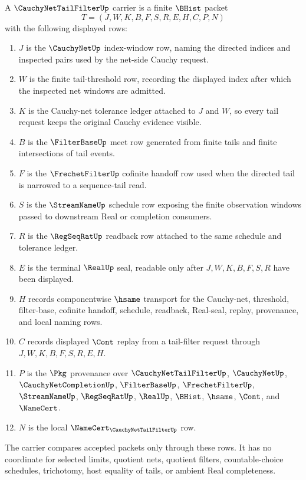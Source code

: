 \begin{definition}
\label{def:cauchy-net-tail-filter-carrier}
A $\CauchyNetTailFilterUp$ carrier is a finite $\BHist$ packet
$$
T=(J,W,K,B,F,S,R,E,H,C,P,N)
$$
with the following displayed rows:
\begin{enumerate}
\item $J$ is the $\CauchyNetUp$ index-window row, naming the directed indices and inspected pairs used by the net-side Cauchy request.
\item $W$ is the finite tail-threshold row, recording the displayed index after which the inspected net windows are admitted.
\item $K$ is the Cauchy-net tolerance ledger attached to $J$ and $W$, so every tail request keeps the original Cauchy evidence visible.
\item $B$ is the $\FilterBaseUp$ meet row generated from finite tails and finite intersections of tail events.
\item $F$ is the $\FrechetFilterUp$ cofinite handoff row used when the directed tail is narrowed to a sequence-tail read.
\item $S$ is the $\StreamNameUp$ schedule row exposing the finite observation windows passed to downstream Real or completion consumers.
\item $R$ is the $\RegSeqRatUp$ readback row attached to the same schedule and tolerance ledger.
\item $E$ is the terminal $\RealUp$ seal, readable only after $J,W,K,B,F,S,R$ have been displayed.
\item $H$ records componentwise $\hsame$ transport for the Cauchy-net, threshold, filter-base, cofinite handoff, schedule, readback, Real-seal, replay, provenance, and local naming rows.
\item $C$ records displayed $\Cont$ replay from a tail-filter request through $J,W,K,B,F,S,R,E,H$.
\item $P$ is the $\Pkg$ provenance over $\CauchyNetTailFilterUp$, $\CauchyNetUp$, $\CauchyNetCompletionUp$, $\FilterBaseUp$, $\FrechetFilterUp$, $\StreamNameUp$, $\RegSeqRatUp$, $\RealUp$, $\BHist$, $\hsame$, $\Cont$, and $\NameCert$.
\item $N$ is the local $\NameCert_{\CauchyNetTailFilterUp}$ row.
\end{enumerate}
The carrier compares accepted packets only through these rows. It has no coordinate for selected limits, quotient nets, quotient filters, countable-choice schedules, trichotomy, host equality of tails, or ambient Real completeness.
\end{definition}

